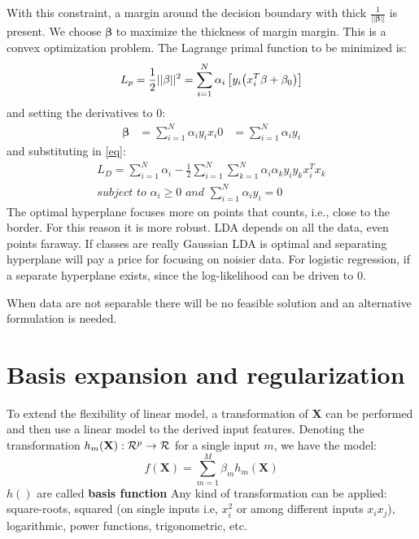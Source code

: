 \documentclass[12pt, letterpaper]{article}
\theoremstyle{definition}
\newcommand{\X}{\mathrm{\mathbf{X}}}
\newcommand{\be}{\mathbf{\beta}}
\DeclarePairedDelimiter\autobracket{(}{)}
\newcommand{\br}[1]{\autobracket*{#1}}
\begin{document}
With this constraint, a margin around the decision boundary with thick $\frac{1}{||\be||}$ is present. We choose $\be$ to maximize the thickness of margin margin.  This is a convex optimization problem. The Lagrange primal function to be minimized is:
\begin{equation}
\label{eq}
L_p = \frac{1}{2} ||\be||^2 = \sum_{i=1}^N \alpha_i\left[ y_i \br{x_i^T\be+\be_0}\right]
\end{equation}
and setting the derivatives to $0$:
\begin{equation}
\begin{aligned}
\be &= \sum_{i=1}^N \alpha_i y_i x_i
0  &= \sum_{i=1}^N \alpha_i y_i
\end{aligned}
\end{equation}
and substituting in \ref{eq}:
\begin{equation}
\begin{aligned}
L_D = \sum_{i=1}^N \alpha_i -\frac{1}{2}\sum_{i=1}^N\sum_{k=1}^N \alpha_i \alpha_ky_iy_kx_i^Tx_k\\
\textit{subject to } \alpha_i\ge0 \textit{ and } \sum_{i=1}^N \alpha_iy_i=0
\end{aligned}
\end{equation}
The optimal hyperplane focuses more on points that counts, i.e., close to the border. For this reason it is more robust. LDA depends on all the data, even points faraway. If classes are really Gaussian LDA is optimal and separating hyperplane will pay a price for focusing on noisier data.
For logistic regression, if a separate hyperplane exists, since the log-likelihood can be driven to $0$.

When data are not separable there will be no feasible solution and an alternative formulation is needed.

\section{Basis expansion and regularization}
To extend the flexibility of linear model, a transformation of $\X$ can be performed and then use a linear model to the derived input features. Denoting the transformation $h_m(\X) : \CMcal{R}^p\rightarrow \CMcal	{R}$ for a single input $m$, we have the model:
\begin{equation}
f(\X) = \sum_{m=1}^M \beta_mh_m(\X)
\end{equation}
$h()$ are called \textbf{basis function}
Any kind of transformation can be applied: square-roots, squared (on single inputs i.e, $x_i^2$ or among different inputs $x_ix_j$), logarithmic, power functions, trigonometric, etc. 
\end{document}
